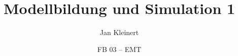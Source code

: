\title{Modellbildung und Simulation 1}
\author{Jan Kleinert}
\date{FB 03 -- EMT}

 



\usepackage{qrcode}

\makeatletter 
\newcommand{\qr}[2]{%
\href{#2}{%
\begin{tikzpicture} 
\node [rectangle,draw=HBRSblue,rounded corners=5pt, line width=2pt, fill=HBRSlightgray]{%
\qrcode{#2}%
\begin{tabular}{l} \textcolor{HBRSblue}{#1}\\\\
\footnotesize{\texttt{\textcolor{HBRSblue}{#2}}} 
\end{tabular} 
}; 
\end{tikzpicture} 
} 
} 
\makeatother
